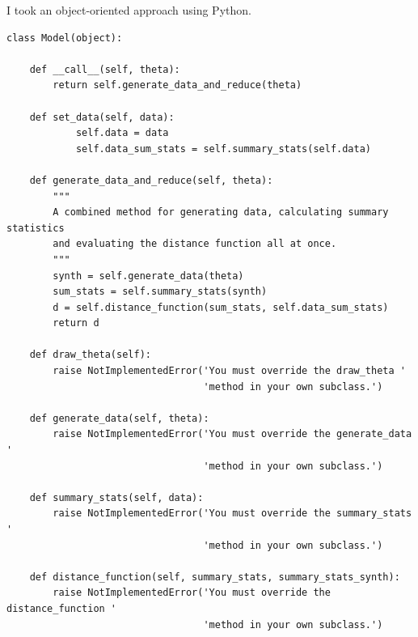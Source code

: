 \documentclass{beamer}
\begin{document}
\begin{frame}[fragile]{I took an object-oriented approach using Python.}
\tiny
\begin{verbatim}
class Model(object):

    def __call__(self, theta):
        return self.generate_data_and_reduce(theta)

    def set_data(self, data):
            self.data = data
            self.data_sum_stats = self.summary_stats(self.data)

    def generate_data_and_reduce(self, theta):
        """
        A combined method for generating data, calculating summary statistics
        and evaluating the distance function all at once.
        """
        synth = self.generate_data(theta)
        sum_stats = self.summary_stats(synth)
        d = self.distance_function(sum_stats, self.data_sum_stats)
        return d

    def draw_theta(self):
        raise NotImplementedError('You must override the draw_theta '
                                  'method in your own subclass.')

    def generate_data(self, theta):
        raise NotImplementedError('You must override the generate_data '
                                  'method in your own subclass.')

    def summary_stats(self, data):
        raise NotImplementedError('You must override the summary_stats '
                                  'method in your own subclass.')

    def distance_function(self, summary_stats, summary_stats_synth):
        raise NotImplementedError('You must override the distance_function '
                                  'method in your own subclass.')
\end{verbatim}
\end{frame}
\end{document}
